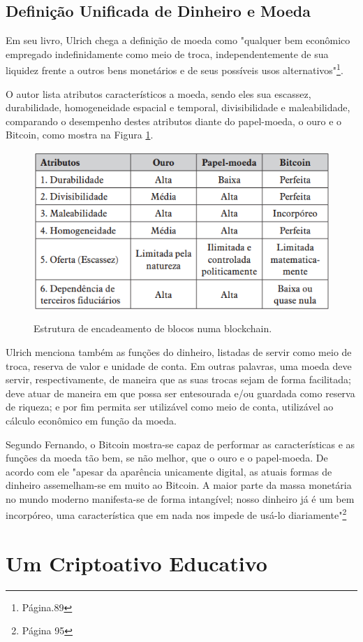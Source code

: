 \subsection*{Definição Unificada de Dinheiro e Moeda}
Em seu livro, Ulrich chega a definição de moeda como "qualquer bem econômico empregado indefinidamente como meio de troca, independentemente de sua liquidez frente a outros bens monetários e de seus possíveis usos alternativos"\footnote{Página.89}.

O autor lista atributos característicos a moeda, sendo eles sua escassez,
durabilidade, homogeneidade espacial e temporal, divisibilidade e maleabilidade, comparando o desempenho destes atributos diante do papel-moeda, o ouro e o Bitcoin, como mostra na Figura \ref*{fig:atributos}.

\begin{figure} [h]
    \centering
        \caption{Estrutura de encadeamento de blocos numa blockchain.}
        \includegraphics[width=.8\linewidth]{images/atributos.png}
        \label{fig:atributos}
\end{figure}

Ulrich menciona também as funções do dinheiro, listadas de servir como meio de troca, reserva de valor e unidade de conta. Em outras palavras, uma moeda deve servir, respectivamente, de maneira que as suas trocas sejam de forma facilitada; deve atuar de maneira em que possa ser entesourada e/ou guardada como reserva de riqueza; e por fim permita ser utilizável como meio de conta, utilizável ao cálculo econômico em função da moeda.

Segundo Fernando, o Bitcoin mostra-se capaz de performar as características e as funções da moeda tão bem, se não melhor, que o ouro e o papel-moeda. De acordo com ele "apesar da aparência unicamente digital, as atuais formas de dinheiro assemelham-se em muito ao Bitcoin. A maior parte da massa monetária no mundo moderno manifesta-se de forma intangível; nosso dinheiro já é um bem incorpóreo, uma característica que em nada nos impede de usá-lo diariamente"\footnote{Página 95}

\section{Um Criptoativo Educativo} \label{sec:criptoeducativo}


